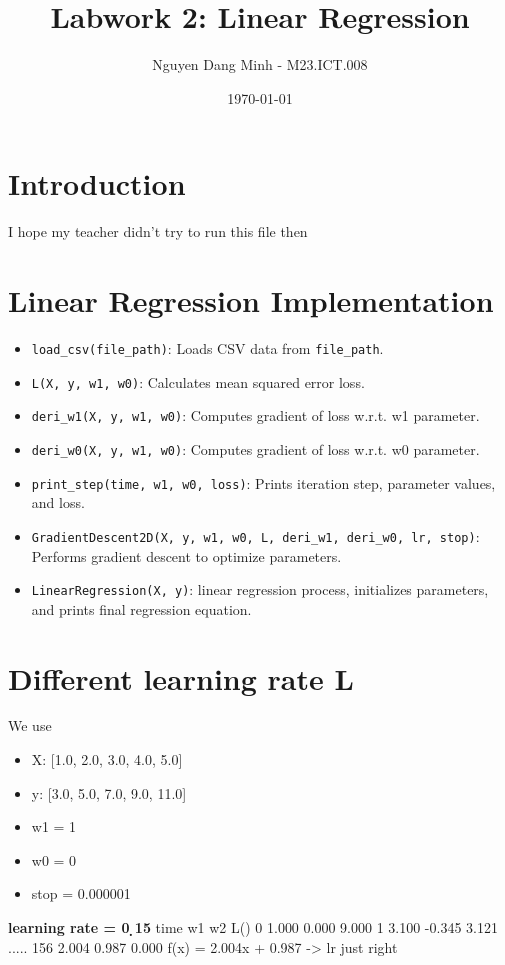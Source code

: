 \documentclass{article}
\title{Labwork 2: Linear Regression}
\author{Nguyen Dang Minh - M23.ICT.008}
\date{\today}
\begin{document}
\maketitle

\section{Introduction}
I hope my teacher didn't try to run this file then

\section{Linear Regression Implementation}

\begin{itemize}
    \item \texttt{load\_csv(file\_path)}: Loads CSV data from \texttt{file\_path}.
    \item \texttt{L(X, y, w1, w0)}: Calculates mean squared error loss.
    \item \texttt{deri\_w1(X, y, w1, w0)}: Computes gradient of loss w.r.t. w1 parameter.
    \item \texttt{deri\_w0(X, y, w1, w0)}: Computes gradient of loss w.r.t. w0 parameter.
    \item \texttt{print\_step(time, w1, w0, loss)}: Prints iteration step, parameter values, and loss.
    \item \texttt{GradientDescent2D(X, y, w1, w0, L, deri\_w1, deri\_w0, lr, stop)}: Performs gradient descent to optimize parameters.
    \item \texttt{LinearRegression(X, y)}: linear regression process, initializes parameters, and prints final regression equation.
\end{itemize}

\section{Different learning rate L}
We use 
\begin{itemize}
    \item X: [1.0, 2.0, 3.0, 4.0, 5.0]
    \item y: [3.0, 5.0, 7.0, 9.0, 11.0]
    \item w1 = 1
    \item w0 = 0
    \item stop = 0.000001
\end{itemize}

\textbf{learning rate = 0 ̣15}
time    w1      w2      L()
0       1.000   0.000   9.000
1       3.100   -0.345  3.121
.....
156     2.004   0.987   0.000
f(x) = 2.004x + 0.987
-> lr just right
\end{document}
